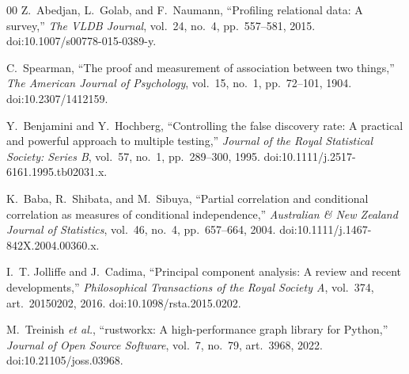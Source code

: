 \documentclass[journal]{IEEEtran}
\begin{document}
\begin{thebibliography}{00}
 Z.~Abedjan, L.~Golab, and F.~Naumann, ``Profiling relational data: A survey,'' \emph{The
VLDB Journal}, vol.~24, no.~4, pp.~557--581, 2015. doi:10.1007/s00778-015-0389-y.

 C.~Spearman, ``The proof and measurement of association between two things,'' \emph{The
American Journal of Psychology}, vol.~15, no.~1, pp.~72--101, 1904. doi:10.2307/1412159.

 Y.~Benjamini and Y.~Hochberg, ``Controlling the false discovery rate: A practical and powerful
approach to multiple testing,'' \emph{Journal of the Royal Statistical Society: Series B}, vol.~57, no.~1,
pp.~289--300, 1995. doi:10.1111/j.2517-6161.1995.tb02031.x.

 K.~Baba, R.~Shibata, and M.~Sibuya, ``Partial correlation and conditional correlation as
measures of conditional independence,'' \emph{Australian \& New Zealand Journal of Statistics}, vol.~46, no.~4,
pp.~657--664, 2004. doi:10.1111/j.1467-842X.2004.00360.x.

 I.~T. Jolliffe and J.~Cadima, ``Principal component analysis: A review and recent developments,''
\emph{Philosophical Transactions of the Royal Society A}, vol.~374, art.~20150202, 2016.
doi:10.1098/rsta.2015.0202.

 M.~Treinish \emph{et al.}, ``rustworkx: A high-performance graph library for Python,''
\emph{Journal of Open Source Software}, vol.~7, no.~79, art.~3968, 2022. doi:10.21105/joss.03968.

\end{thebibliography}
\end{document}
